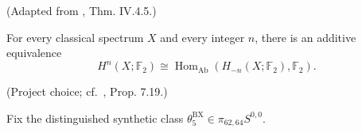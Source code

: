 \begin{definition}
\label{frontier:Literature:87014c07c847}
(Adapted from \cite{EKMM}, Thm. IV.4.5.)\par{}

For every classical spectrum $X$ and every integer $n$, there is an additive equivalence\[H^n(X;\mathbb F_2)\cong\operatorname{Hom}_{\mathrm{Ab}}(H_{-n}(X;\mathbb F_2),\mathbb F_2).\]
\end{definition}

\begin{definition}
\label{frontier:Literature:9e21a71352a4}
(Project choice; cf.\ \cite{BurklundXu}, Prop. 7.19.)\par{}

Fix the distinguished synthetic class $\theta_5^{\mathrm{BX}}\in\pi_{62,64}S^{0,0}$.
\end{definition}

